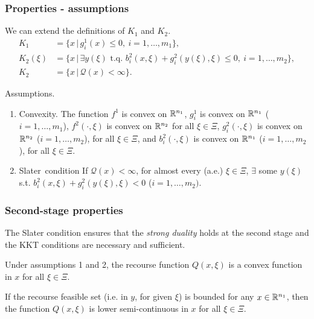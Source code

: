\documentclass[french]{beamer}
\begin{document}
\begin{frame}
	\frametitle{Properties - assumptions}
	
	We can extend the definitions of $K_1$ and $K_2$.
	\begin{align*}
		K_1 &= \lbrace x \,|\, g_i^1(x) \leq 0,\ i = 1,\ldots,m_1 \rbrace,\\
		K_2(\xi) &= \lbrace x \,|\, \exists y(\xi) \mbox{ t.q. } b_i^2(x,\xi) +
		g_i^2(y(\xi),\xi) \leq 0,\ i = 1,\ldots,m_2 \rbrace,\\
		K_2 &= \lbrace x \,|\, \mathcal{Q}(x) < \infty \rbrace.
	\end{align*}
	
	{\blue Assumptions}.
	\begin{enumerate}
		\item \mbox{\red Convexity}.
		The function $f^1$ is convex on ${\mathbb{R}}^{n_1}$, $g_i^1$ is convex on ${\mathbb{R}}^{n_1}$ ($i =
		1,\ldots,m_1$), $f^2(\cdot,\xi)$ is convex on ${\mathbb{R}}^{n_2}$ for all $\xi \in \Xi$, $g_i^2(\cdot,\xi)$ is convex on ${\mathbb{R}}^{n_2}$ ($i = 1,\ldots,m_2$), for all $\xi \in \Xi$, and $b_i^2(\cdot, \xi)$ is convex on ${\mathbb{R}}^{n_1}$ ($i = 1,\ldots,m_2$), for all $\xi \in \Xi$.
		\item \mbox{\red Slater condition}
		If $\mathcal{Q}(x) < \infty$, for almost every (a.e.) $\xi \in \Xi$, $\exists$ some $y(\xi)$ s.t. $b_i^2(x, \xi) + g_i^2(y(\xi), \xi) < 0$ ($i = 1,\ldots,m_2)$.
	\end{enumerate}
	
\end{frame}

\begin{frame}
\frametitle{Second-stage properties}

The Slater condition ensures that the \textit{strong duality} holds at the second stage and the KKT conditions are necessary and sufficient.

\mbox{}

\begin{theorem}
Under assumptions 1 and 2, the recourse function $Q(x,\xi)$ is a convex function in $x$ for all $\xi \in \Xi$.
\end{theorem}

\begin{theorem}
If the recourse feasible set (i.e. in $y$, for given $\xi$) is bounded for any $x \in {\mathbb{R}}^{n_1}$, then the function $Q(x,\xi)$ is lower semi-continuous in $x$ for all $\xi \in \Xi$.
\end{theorem}

\end{frame}
\end{document}
